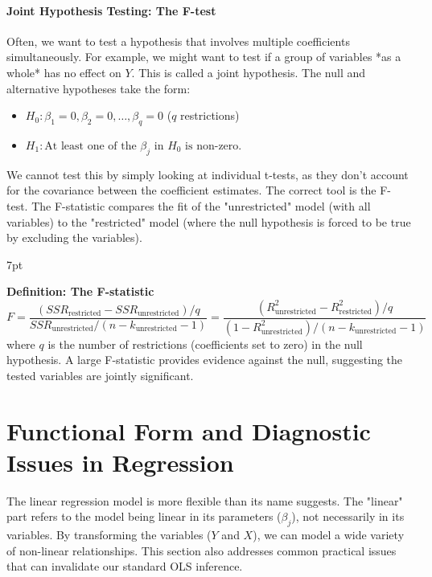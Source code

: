 \documentclass{article}
\providecommand{\tightlist}{
  \setlength{\itemsep}{0pt}
  \setlength{\parskip}{0pt}}
\newenvironment{greenblock}{%
\def\FrameCommand{%
  \hspace{1pt}%
    {\color{Green}%
    \vrule width 2pt}%
    {\color{greenshade}%
    \vrule width 4pt}%
  \colorbox{greenshade}%
}%
\MakeFramed{%
  \advance%
  \hsize-%
  \width%
  \FrameRestore}%
\noindent\hspace{-4.55pt}%
\begin{adjustwidth}{}{7pt}%
\vspace{2pt}\vspace{2pt}%
}
{%
\vspace{2pt}\end{adjustwidth}\endMakeFramed%
}
\begin{document}
\paragraph{Joint Hypothesis Testing: The F-test}
Often, we want to test a hypothesis that involves multiple coefficients simultaneously. For example, we might want to test if a group of variables *as a whole* has no effect on $Y$. This is called a joint hypothesis.
The null and alternative hypotheses take the form:
\begin{itemize}
    \tightlist
    \item $H_0: \beta_1=0, \beta_2=0, \dots, \beta_q=0$ ($q$ restrictions)
    \item $H_1: \text{At least one of the } \beta_j \text{ in } H_0 \text{ is non-zero.}$
\end{itemize}
We cannot test this by simply looking at individual t-tests, as they don't account for the covariance between the coefficient estimates. The correct tool is the F-test. The F-statistic compares the fit of the "unrestricted" model (with all variables) to the "restricted" model (where the null hypothesis is forced to be true by excluding the variables).

\begin{greenblock}
\textbf{Definition: The F-statistic}
\begin{equation}
  F=
  \frac{(SSR_{\text{restricted}}-SSR_{\text{unrestricted}})/q}{SSR_{\text{unrestricted}}/(n-k_{\text{unrestricted}}-1)}
  =
  \frac{(R^2_{\text{unrestricted}}-R^2_{\text{restricted}})/q}{(1-R^2_{\text{unrestricted}})/(n-k_{\text{unrestricted}}-1)}
\end{equation}
where $q$ is the number of restrictions (coefficients set to zero) in the null hypothesis. A large F-statistic provides evidence against the null, suggesting the tested variables are jointly significant.
\end{greenblock}





\section{Functional Form and Diagnostic Issues in Regression}
\label{sec:functional_form_diagnostics}

The linear regression model is more flexible than its name suggests. The "linear" part refers to the model being linear in its parameters ($\beta_j$), not necessarily in its variables. By transforming the variables ($Y$ and $X$), we can model a wide variety of non-linear relationships. This section also addresses common practical issues that can invalidate our standard OLS inference.
\end{document}
